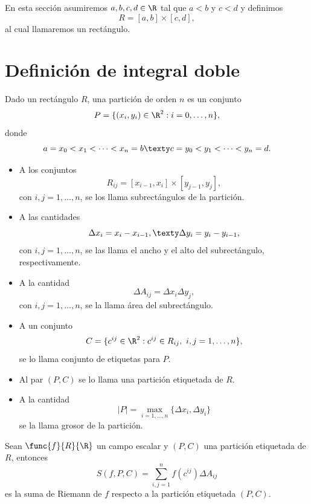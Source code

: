 \documentclass[a4,11pt]{aleph-notas}
\begin{document}
\encabezado

En esta sección asumiremos $a,b,c,d\in\R$ tal que $a<b$ y $c<d$ y definimos
\[
    R=[a,b]\times [c,d],
\]
al cual llamaremos un rectángulo.

\section{Definición de integral doble}

\begin{defi}
    Dado un rectángulo $R$, una partición de orden $n$ es un conjunto
    \[
        P=\{(x_i,y_i)\in\R^2:i=0,\ldots,n\},
    \]
    donde
    \[
        a=x_0<x_1<\cdots<x_n=b
    \texty
        c=y_0<y_1<\cdots<y_n=d.
    \]
    \begin{itemize}
    \item
        A los conjuntos
        \[
            R_{ij}=[x_{i-1},x_i]\times[y_{j-1},y_j],
        \]
        con $i,j=1,\ldots,n$, se los llama subrectángulos de la partición.
    \item
        A las cantidades
        \[
            \Delta x_i=x_i-x_{i-1},
            \texty
            \Delta y_i=y_i-y_{i-1},
        \]
        con $i,j=1,\ldots,n$, se las llama el ancho y el alto del subrectángulo, respectivamente.
    \item
        A la cantidad
        \[
            \Delta A_{ij} = \Delta x_i\Delta y_j,
        \]
        con $i,j=1,\ldots,n$, se la llama área del subrectángulo.
    \item
        A un conjunto
        \[
            C = \{c^{ij}\in\R^2: c^{ij}\in R_{ij},\ i,j=1,\ldots,n\},
        \]
        se lo llama conjunto de etiquetas para $P$.
    \item
        Al par $(P,C)$ se lo llama una partición etiquetada de $R$.
    \item
        A la cantidad
        \[
            |P| = \max_{i=1,\ldots,n}\{\Delta x_i,\Delta y_i\}
        \]
        se la llama grosor de la partición.
    \end{itemize}
\end{defi}

\begin{defi}
    Sean $\func{f}{R}{\R}$ un campo escalar y $(P,C)$ una partición etiquetada de $R$, entonces
    \[
        S(f,P,C) = \sum_{i,j=1}^n f(c^{ij})\Delta A_{ij}
    \]
    es la suma de Riemann de $f$ respecto a la partición etiquetada $(P,C)$.
\end{defi}
\end{document}
